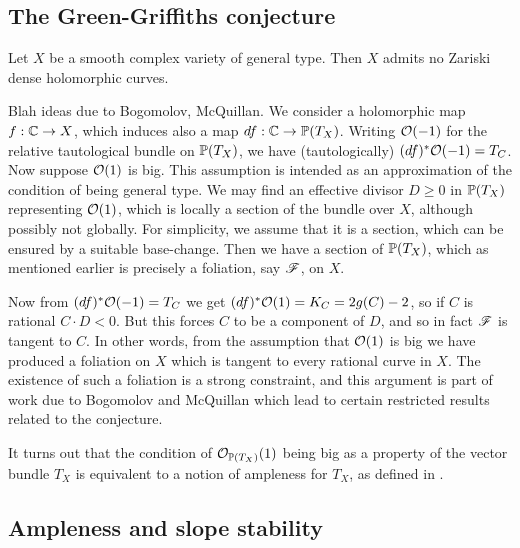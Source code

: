 

\subsection{The Green-Griffiths conjecture}


\begin{conjecture}
    Let $X$ be a smooth complex variety of general type. Then $X$ admits no
    Zariski dense holomorphic curves.
\end{conjecture}

Blah ideas due to Bogomolov, McQuillan. We consider a holomorphic map
$f:\C\to X$, which induces also a map $df:\C\to\P(T_X)$. Writing $\O(-1)$ for
the relative tautological bundle on $\P(T_X)$, we have (tautologically)
$(df)^*\O(-1)=T_C$. Now suppose $\O(1)$ is big. %
This assumption is intended as an approximation of the condition of being
general type. We may find an effective divisor $D\ge0$ in $\P(T_X)$ representing
$\O(1)$, which is locally a section of the bundle over $X$, although possibly
not globally. For simplicity, we assume that it is a section, which can be
ensured by a suitable base-change. Then we have a section of $\P(T_X)$, which as
mentioned earlier is precisely a foliation, say $\scrF$, on $X$.

Now from $(df)^*\O(-1)=T_C$ we get $(df)^*\O(1)=K_C=2g(C)-2$, so if $C$ is
rational $C\cdot D<0$. But this forces $C$ to be a component of $D$, and so in
fact $\scrF$ is tangent to $C$. %
In other words, from the assumption that $\O(1)$ is big we have produced a
foliation on $X$ which is tangent to every rational curve in $X$. The existence
of such a foliation is a strong constraint, and this argument is part of work
due to Bogomolov and McQuillan \cite{mcquillan_98} which lead to certain
restricted results related to the conjecture.

It turns out that the condition of $\O_{\P(T_X)}(1)$ being big as a property of
the vector bundle $T_X$ is equivalent to a notion of ampleness for $T_X$, as
defined in \cite{hartshorne_66}. %

\subsection{Ampleness and slope stability}


